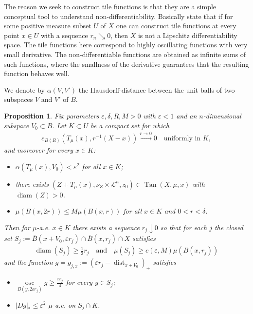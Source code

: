 \documentclass{amsart}
\newtheorem{proposition}[theorem]{Proposition}
\numberwithin{equation}{section}
\newcommand{\leb}{\mathcal{L}}
\newcommand{\dist}{\operatorname{dist}}
\newcommand{\diam}{\operatorname{diam}}
\newcommand{\inv}{^{-1}}
\newcommand{\Tan}{\operatorname{Tan}}
\begin{document}
 The reason we seek to construct tile functions is that they are a simple conceptual tool to understand non-differentiability. Basically \cite[Theorems 4.1 and 4.3]{sch16a} state that if for some positive measure subset $U$ of $X$ one can construct tile functions at every point $x\in U$ with a sequence $r_n\searrow 0$, then $X$ is not a Lipschitz differentiability space. The tile functions here correspond to highly oscillating functions with very small derivative. The non-differentiable functions are obtained as infinite sums of such functions, where the smallness of the derivative guarantees that the resulting function behaves well.


 We denote by $\alpha(V,V')$ the Hausdorff-distance between the unit balls of two subspaces $V$ and $V'$ of $B$.

\begin{proposition}\label{prop:pre-tile} Fix parameters $\varepsilon,\delta, R,M>0$ with $\varepsilon < 1$ and an $n$-dimensional subspace $V_0\subset B$.
Let $K\subset U$ be a compact set for which 
\begin{align*}
    e_{B(R)}(T_\mu(x),r\inv(X-x))\stackrel{r\to 0}{\longrightarrow} 0\quad\mbox{uniformly in }K,
\end{align*}
and moreover for every $x\in K$:
\begin{itemize}
    \item[(i)] $\alpha(T_\mu(x),V_0)<\varepsilon^2$ for all $x\in K$;
    \item[(ii)] there exists $(Z+T_\mu(x),\nu_Z\times \leb^n,z_0)\in \Tan(X,\mu,x)$ with $\diam(Z)>0$.
    \item[(iii)]  $\mu(B(x,2r))\le M\mu(B(x,r))$ for all $x\in K$ and $0<r<\delta$.
\end{itemize}
Then for $\mu$-a.e. $x\in K$ there exists a sequence $r_j\downarrow 0$ so that for each $j$ the closed set $S_j:=\bar B(x+V_0,\varepsilon r_j)\cap \bar B(x,r_j)\cap X$ satisfies 
\begin{align}\label{eq:set}
\diam(S_j)\ge \frac 12 r_j\quad\mbox{and}\quad\mu(S_j)\ge c(\varepsilon,M)\mu(B(x,r_j))
\end{align}
and the function $g=g_{j,x}:=(\varepsilon r_j-\dist_{x+V_0})_+$ satisfies
\begin{itemize}
    \item[(a)] $\underset{B(y,2\varepsilon r_j)}{\operatorname{osc}}g\ge \frac{\varepsilon r_j}{4}$ for every $y\in S_j$; 
    \item[(b)] $|Dg|_\ast\le \varepsilon^2$ $\mu$-a.e. on $S_j\cap K$.
\end{itemize}
\end{proposition}
\end{document}
